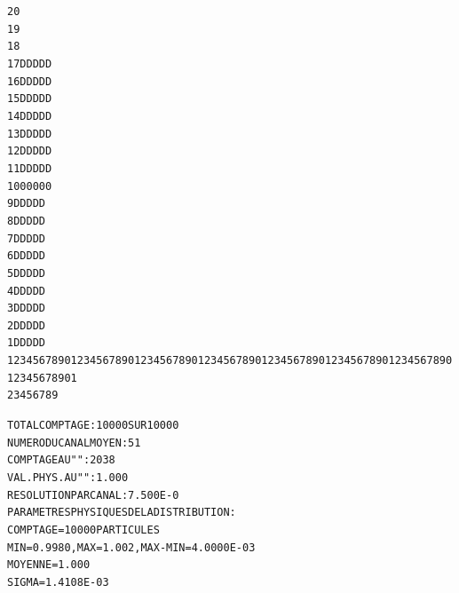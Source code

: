 \begin{tiny}
\begin{center}
\begin{alltt}
   20                                                                                                
   19                                                                                                
   18                                                                                                
   17                    D             D            D            D             D             
   16                    D             D            D            D             D             
   15                    D             D            D            D             D             
   14                    D             D            D            D             D             
   13                    D             D            D            D             D             
   12                    D             D            D            D             D             
   11                    D             D            D            D             D             
   10                    0             0            0            0             0             
    9                    D             D            D            D             D             
    8                    D             D            D            D             D             
    7                    D             D            D            D             D             
    6                    D             D            D            D             D             
    5                    D             D            D            D             D             
    4                    D             D            D            D             D             
    3                    D             D            D            D             D             
    2                    D             D            D            D             D             
    1                    D             D            D            D             D      
            123456789012345678901234567890123456789012345678901234567890123456789012345678901        
                     2         3         4         5         6         7         8         9

             
        TOTAL  COMPTAGE                 :   10000  SUR  10000
        NUMERO   DU  CANAL  MOYEN       :      51
        COMPTAGE  AU   "      "         :    2038
        VAL. PHYS. AU  "      "         :  1.000          
        RESOLUTION  PAR  CANAL          :  7.500E-0
        PARAMETRES  PHYSIQUES  DE  LA  DISTRIBUTION :
                      COMPTAGE =  10000  PARTICULES
                      MIN =  0.9980    , MAX =   1.002    , MAX-MIN =  4.0000E-03      
                      MOYENNE =   1.000          
                      SIGMA =  1.4108E-03      


\end{alltt}
\end{center}
\end{tiny}
